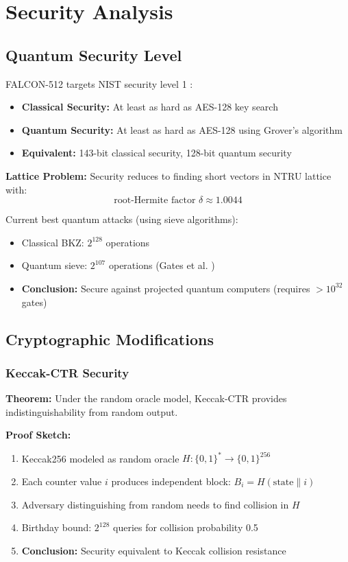 \section{Security Analysis}


\subsection{Quantum Security Level}

FALCON-512 targets NIST security level 1 \cite{nist2016submission}:
\begin{itemize}
    \item \textbf{Classical Security:} At least as hard as AES-128 key search
    \item \textbf{Quantum Security:} At least as hard as AES-128 using Grover's algorithm
    \item \textbf{Equivalent:} 143-bit classical security, 128-bit quantum security
\end{itemize}

\textbf{Lattice Problem:} Security reduces to finding short vectors in NTRU lattice with:
\begin{equation}
\text{root-Hermite factor } \delta \approx 1.0044
\end{equation}

Current best quantum attacks (using sieve algorithms):
\begin{itemize}
    \item Classical BKZ: $2^{128}$ operations
    \item Quantum sieve: $2^{107}$ operations (Gates et al. \cite{gates2019estimating})
    \item \textbf{Conclusion:} Secure against projected quantum computers (requires $>10^{32}$ gates)
\end{itemize}

\subsection{Cryptographic Modifications}

\subsubsection{Keccak-CTR Security}

\textbf{Theorem:} Under the random oracle model, Keccak-CTR provides indistinguishability from random output.

\textbf{Proof Sketch:}
\begin{enumerate}
    \item Keccak256 modeled as random oracle $H: \{0,1\}^* \rightarrow \{0,1\}^{256}$
    \item Each counter value $i$ produces independent block: $B_i = H(\text{state} \| i)$
    \item Adversary distinguishing from random needs to find collision in $H$
    \item Birthday bound: $2^{128}$ queries for collision probability 0.5
    \item \textbf{Conclusion:} Security equivalent to Keccak collision resistance
\end{enumerate}

